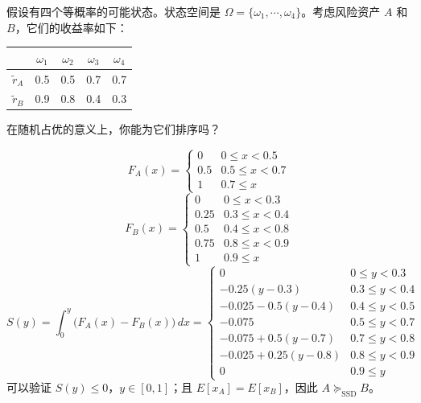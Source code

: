 
\begin{problem}
 假设有四个等概率的可能状态。状态空间是 $\Omega=\{\omega_{1},\cdots,\omega_{4}\}$。考虑风险资产 $A$ 和 $B$，它们的收益率如下：
\begin{center}
\begin{tabular}{c|cccc}
    & $\omega_{1}$ & $\omega_{2}$ & $\omega_{3}$ & $\omega_{4}$ \\
    \hline
    $\tilde{r}_{A}$ & 0.5 & 0.5 & 0.7 & 0.7 \\
    $\tilde{r}_{B}$ & 0.9 & 0.8 & 0.4 & 0.3
\end{tabular}
\end{center}
在随机占优的意义上，你能为它们排序吗？
\end{problem}
\begin{solution}
\[
    F_{A}(x)=\begin{cases}
        0 & 0\le x<0.5\\
        0.5 & 0.5\le x<0.7\\
        1 & 0.7\le x
    \end{cases}
\]
\[
    F_{B}(x)=\begin{cases}
        0 & 0\le x<0.3\\
        0.25 & 0.3\le x<0.4\\
        0.5 & 0.4\le x<0.8\\
        0.75 & 0.8\le x<0.9\\
        1 & 0.9\le x
    \end{cases}
\]
\[
    S(y)=\int_{0}^{y}\bigl(F_{A}(x)-F_{B}(x)\bigr)\,dx=\begin{cases}
        0 & 0\le y<0.3\\
        -0.25(y-0.3) & 0.3\le y<0.4\\
        -0.025-0.5(y-0.4) & 0.4\le y<0.5\\
        -0.075 & 0.5\le y<0.7\\
        -0.075+0.5(y-0.7) & 0.7\le y<0.8\\
        -0.025+0.25(y-0.8) & 0.8\le y<0.9\\
        0 & 0.9\le y
    \end{cases}
\]
可以验证 $S(y)\le 0$，$y\in[0,1]$；且 $E[x_{A}]=E[x_{B}]$，因此 $A\succeq_{\mathrm{SSD}}B$。
\end{solution}

